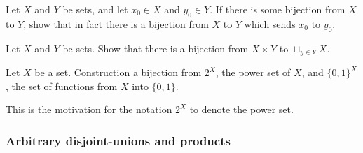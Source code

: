 \begin{exr}\label{exrA.1.27}
Let $X$ and $Y$ be sets, and let $x_0\in X$ and $y_0\in Y$.  If there is some bijection from $X$ to $Y$, show that in fact there is a bijection from $X$ to $Y$ which sends $x_0$ to $y_0$.
\end{exr}
\begin{exr}\label{exrA.1.28}
Let $X$ and $Y$ be sets.  Show that there is a bijection from $X\times Y$ to $\sqcup _{y\in Y}X$.
\end{exr}
\begin{exr}\label{exrA.1.26x}
Let $X$ be a set.  Construction a bijection from $2^X$, the power set of $X$, and $\{ 0,1\}^X$, the set of functions from $X$ into $\{ 0,1\}$.
\begin{rmk}
This is the motivation for the notation $2^X$ to denote the power set.
\end{rmk}
\end{exr}

\subsubsection{Arbitrary disjoint-unions and products}

